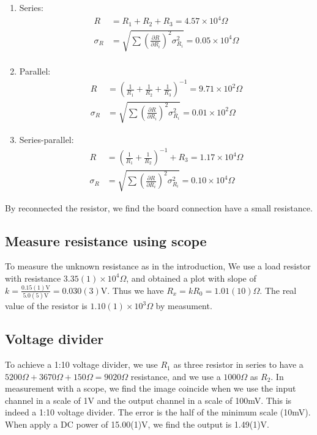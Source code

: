 \documentclass[aps,prl,reprint]{revtex4-1}
\begin{document}
    \begin{enumerate}
        \item Series:
        \begin{align*}
            R &= R_1 + R_2 + R_3 = 4.57\times 10^4 \Omega \\
            \sigma_R &= \sqrt{\sum (\frac{\partial R}{\partial R_i})^2\sigma_{R_i}^2} = 0.05\times 10^4 \Omega\\
        \end{align*}
        \item Parallel:
        \begin{align*}
            R &= \left(\frac{1}{R_1}+\frac{1}{R_2}+\frac{1}{R_3}\right)^{-1}\!\!\!\!\!\! = 9.71 \times 10^2 \Omega\\
            \sigma_R &= \sqrt{\sum (\frac{\partial R}{\partial R_i})^2\sigma_{R_i}^2} = 0.01 \times 10^2 \Omega
        \end{align*}
        \item Series-parallel:
        \begin{align*}
            R &= \left(\frac{1}{R_1}+\frac{1}{R_2}\right)^{-1}\!\!\!\!\!\! + R_3 = 1.17 \times 10^4 \Omega\\
            \sigma_R &= \sqrt{\sum (\frac{\partial R}{\partial R_i})^2\sigma_{R_i}^2} = 0.10 \times 10^4 \Omega
        \end{align*}
    \end{enumerate}
    By reconnected the resistor, we find the board connection have a small resistance.

    \subsection{Measure resistance using scope}
    To measure the unknown resistance as in the introduction, We use a load resistor with resistance $3.35(1)\times 10^4 \Omega$, and obtained a plot with slope of $k = \frac{0.15(1)\text{V}}{5.0(5)\text{V}} = 0.030(3)\text{V}$. Thus we have $R_x = kR_0 = 1.01(10)\Omega$. The real value of the resistor is $1.10(1)\times 10^3\Omega$ by measument.

    \subsection{Voltage divider}
    To achieve a 1:10 voltage divider, we use $R_1$ as three resistor in series to have a $5200\Omega+3670\Omega+150\Omega = 9020\Omega$ resistance, and we use a $1000\Omega$ as $R_2$. In measurement with a scope, we find the image coincide when we use the input channel in a scale of 1V and the output channel in a scale of 100mV. This is indeed a 1:10 voltage divider. The error is the half of the minimum scale (10mV). When apply a DC power of 15.00(1)V, we find the output is 1.49(1)V.
\end{document}
